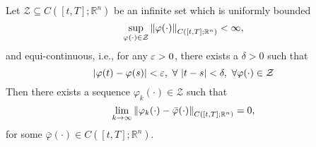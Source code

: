     \begin{theorem}\label{AAT}
    	Let $\mathcal{Z}\subseteq C([t,T];\mathbb{R}^n)$ be an infinite set which is 
    	uniformly bounded 
    	$$
    	    \sup_{\varphi(\cdot)\in \mathcal{Z}} \norm{\varphi(\cdot)}_{C([t,T]; %
    	    \mathbb{R}^n)}<\infty,
    	$$
    	and equi-continuous, i.e., for any $\varepsilon > 0$, there exists a $\delta > 0$ 
    	such that
    	$$
    	    \abs{\varphi(t)-\varphi(s)} < \veps, \, \, \forall \, \abs{t-s} < \delta, %
    	    \, \, \forall \varphi(\cdot)\in \mathcal{Z}
    	$$
    	Then there exists a sequence $\varphi_k(\cdot)\in \mathcal{Z}$ such that 
    	$$
    	    \lim_{k \to \infty} \norm{\varphi_k(\cdot) - \bar{\varphi}(\cdot)} %
    	    _{C([t,T];\mathbb{R}^n)}=0,
    	$$
        for some $\bar{\varphi}(\cdot) \in C([t,T];\mathbb{R}^n)$.	
        
    \end{theorem}
